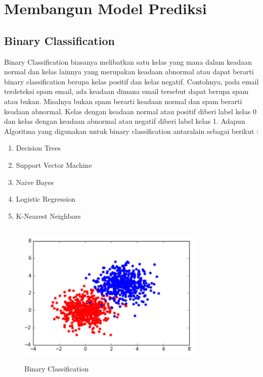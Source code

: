 \chapter{Membangun Model Prediksi}

\section{Binary Classification}
	Binary Classification biasanya melibatkan satu kelas yang mana dalam keadaan normal dan kelas lainnya yang merupakan keadaan abnormal atau dapat berarti binary classification berupa kelas positif dan kelas negatif. Contohnya, pada email terdeteksi spam email, ada keadaan dimana email tersebut dapat berupa spam atau bukan.  Misalnya bukan spam berarti keadaan normal dan spam berarti keadaan abnormal. Kelas dengan keadaan normal atau positif diberi label kelas 0 dan kelas dengan keadaan abnormal atau negatif diberi label kelas 1. 
	\newline Adapun Algoritma yang digunakan untuk binary classification antaralain sebagai berikut :
	\begin{enumerate}
		\item Decision Trees
		\item Support Vector Machine
		\item Naive Bayes
		\item Logistic Regression
		\item K-Nearest Neighbors
	\end{enumerate}

	\begin{figure}[!htbp]
		\centering
		\includegraphics[width=9cm,height=7cm]{figures/Cp2-binaryClassification.png}
		\caption{Binary Classification}
	\end{figure}

